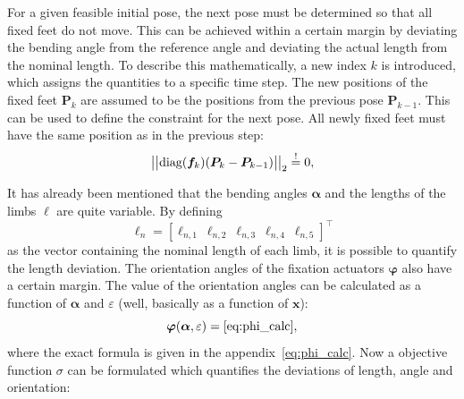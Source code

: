 \documentclass[10pt,a4paper]{article}
\newcommand{\mbeq}{\overset{!}{=}}
\begin{document}
For a given feasible initial pose, the next pose must be determined so that all fixed feet do not move.
This can be achieved within a certain margin by deviating the bending angle from the reference angle and deviating the actual length from the nominal length.
To describe this mathematically, a new index $k$ is introduced, which assigns the quantities to a specific time step.
The new positions of the fixed feet $\bm{P}_{k}$ are assumed to be the positions from the previous pose $\bm{P}_{k-1}$.
This can be used to define the constraint for the next pose.
All newly fixed feet must have the same position as in the previous step:
\begin{equation}
\big|\big|\textnormal{diag}(\bm{f}_k)(\bm{P}_{k} - \bm{P}_{k-1})\big|\big|_2 \mbeq 0,
\label{eq:constraint}
\end{equation}




It has already been mentioned that the bending angles $\bm{\alpha}$ and the lengths of the limbs $\bm{\ell}$ are quite variable. 
By defining 
\begin{equation}
\bm{\ell}_n = \left[ \ell_{n,1}~\ell_{n,2}~\ell_{n,3}~\ell_{n,4}~\ell_{n,5} \right]^\top
\end{equation}
as the vector containing the nominal length of each limb, it is possible to quantify the length deviation.
The orientation angles of the fixation actuators $\bm{\varphi}$ also have a certain margin.
The value of the orientation angles can be calculated as a function of $\bm{\alpha}$ and $\varepsilon$ (well, basically as a function of $\bm{x}$):
\begin{equation}
\bm{\varphi}(\bm{\alpha}, \varepsilon) = \eqref{eq:phi_calc},
\end{equation}
where the exact formula is given in the appendix~\eqref{eq:phi_calc}.
Now a objective function $\sigma$ can be formulated which quantifies the deviations of length, angle and orientation:
\end{document}
